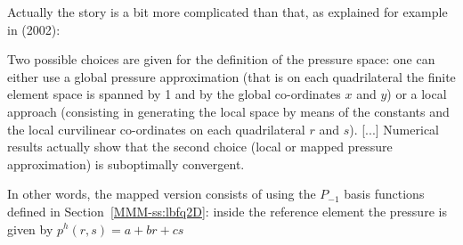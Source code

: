 Actually the story is a bit more complicated than that, as explained for 
example in \textcite{boga02} (2002):
\begin{displayquote}
{\color{darkgray}
Two possible choices are given for the definition of the pressure space: 
one can either use a global pressure approximation (that is on
each quadrilateral the finite element space is spanned by 1 and by the 
global co-ordinates $x$ and $y$) or a local approach (consisting in generating 
the local space by means of the constants and the local curvilinear 
co-ordinates on each quadrilateral $r$ and $s$). [...] Numerical results 
actually show that the second choice (local or mapped pressure approximation) 
is suboptimally convergent.
}
\end{displayquote}

In other words, the mapped version consists of  
using the $P_{-1}$ basis functions defined in Section~\ref{MMM-ss:lbfq2D}:
inside the reference element the pressure is given by $p^h(r,s)=a+br+cs$ 

